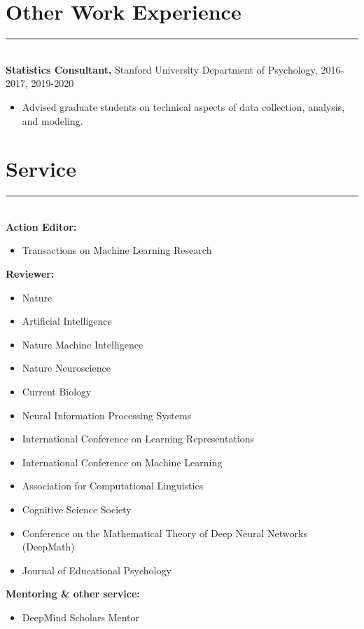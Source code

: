 \documentclass[margin]{res}
\begin{document}
\begin{resume}
\vspace{1pt}\section{Other Work Experience} \vspace{-15pt} \rule{\textwidth}{0.5pt} \\[3pt]
{\bf Statistics Consultant,} Stanford University Department of Psychology, 2016-2017, 2019-2020
\begin{itemize} \itemsep -2pt
 \item Advised graduate students on technical aspects of data collection, analysis, and modeling. \end{itemize}
\vspace{1pt}\section{Service} \vspace{-15pt} \rule{\textwidth}{0.5pt} \\[3pt]
{\bf Action Editor:}
\begin{itemize} \itemsep -2pt
 \item Transactions on Machine Learning Research
\end{itemize}
{\bf Reviewer:} 
\begin{itemize} \itemsep -2pt
 \item Nature
 \item Artificial Intelligence
 \item Nature Machine Intelligence 
 \item Nature Neuroscience 
 \item Current Biology 
 \item Neural Information Processing Systems
 \item International Conference on Learning Representations 
 \item International Conference on Machine Learning
 \item Association for Computational Linguistics
 \item Cognitive Science Society
 \item Conference on the Mathematical Theory of Deep Neural Networks (DeepMath)
 \item Journal of Educational Psychology
 \end{itemize}
{\bf Mentoring \& other service:} 
\begin{itemize} \itemsep -2pt
 \item DeepMind Scholars Mentor

\end{itemize}
\end{resume}
\end{document}
